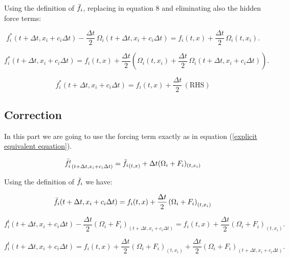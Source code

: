 Using the definition of $\Bar{f_i}$, replacing in equation 8 and eliminating
also the hidden force terms: 

\begin{equation}
    f_i^* (t+\Delta t, x_i + c_i \Delta t) 
    - \frac{\Delta t}{2} \, \Omega_i (t+\Delta t, x_i + c_i \Delta t) 
    = f_i (t, x) 
    + \frac{\Delta t}{2} \, \Omega_i (t, x_i).
\end{equation}

\begin{equation}
    f_i^* (t+\Delta t, x_i + c_i \Delta t) 
    = f_i (t, x) 
    + \frac{\Delta t}{2} \left( \Omega_i (t, x_i) 
    + \frac{\Delta t}{2} \, \Omega_i (t+\Delta t, x_i + c_i \Delta t) \right).
\end{equation}

\begin{equation}
    f_i^* (t+\Delta t, x_i + c_i \Delta t) = f_i (t, x) + \frac{\Delta t}{2} \, (\text{RHS})
    \label{Prediction equation}
\end{equation}

\subsection{Correction}
In this part we are going to use the forcing term exactly as in equation
(\ref{explicit equivalent equation}).  

\begin{equation}
    \Bar{f_i^t}_{(t+\Delta t, x_i +c_i \Delta t)} = \Bar{f_i}_{(t,x)} + \Delta t(\Omega_i +F_i)_{(t, x_i)}
\end{equation}

Using the definition of $\Bar{f_i}$ we have:

\begin{equation}
    \Bar{f_i} (t+\Delta t, x_i + c_i \Delta t) = f_i (t, x) + \frac{\Delta t}{2} \left( \Omega_i + F_i \right)_{(t, x_i)}
\end{equation}  

\begin{equation}
    f_i^t (t+\Delta t, x_i + c_i \Delta t) 
    - \frac{\Delta t}{2} \left( \Omega_i + F_i \right)_{(t+\Delta t, x_i + c_i \Delta t)} 
    = f_i (t, x) 
    + \frac{\Delta t}{2} \left( \Omega_i + F_i \right)_{(t, x_i)}.
\end{equation}  

\begin{equation}
    f_i^t (t+\Delta t, x_i + c_i \Delta t) = f_i (t, x) 
    + \frac{\Delta t}{2} \left( \Omega_i + F_i \right)_{(t, x_i)} 
    + \frac{\Delta t}{2} \left( \Omega_i + F_i \right)_{(t+\Delta t, x_i + c_i \Delta t)}.
\end{equation}  

